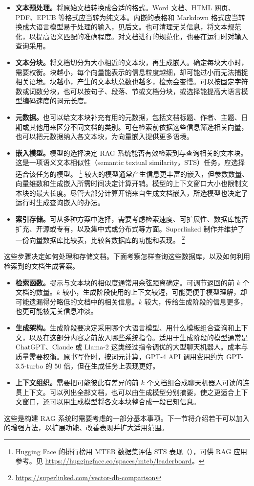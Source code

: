 \begin{itemize}
\item \textbf{文本预处理。}将原始文档转换成合适的格式。Word 文档、HTML 网页、PDF、EPUB 等格式应当转为纯文本。内嵌的表格和 Markdown 格式应当转换成大语言模型易于处理的输入，见后文。也可清理无关信息，将文本规范化，以提高语义匹配的准确程度。对文档进行的规范化，也要在运行时对输入查询采用。
\item \textbf{文本分块。}将文档切分为大小相近的文本块，再生成嵌入。确定每块大小时，需要权衡。块越小，每个向量能表示的信息粒度越细，却可能过小而无法捕捉相关语境。块越小，产生的文本块总数也越多，检索会变慢。可以按固定字符数或词数分块，也可以按句子、段落、节或文档分块，或选择能提高大语言模型编码速度的词元长度。
\item \textbf{元数据。}也可以给文本块补充有用的元数据，包括文档标题、作者、主题、日期或其他用来区分不同文档的类别。可在检索前依据这些信息筛选相关向量，也可以把元数据纳入各文本块，为向量嵌入提供更多语境。
\item \textbf{嵌入模型。}模型的选择决定 RAG 系统能否有效检索到与查询相关的文本块。这是一项语义文本相似性（semantic textual similarity，STS）任务，应选择适合该任务的模型。%
\footnote{Hugging Face 的排行榜用 MTEB 数据集评估 STS 表现（），可供 RAG 应用参考。见 \url{https://huggingface.co/spaces/mteb/leaderboard}。}
较大的模型通常产生信息更丰富的嵌入，但参数数量、向量维数和生成嵌入所需时间决定计算开销。模型的上下文窗口大小也限制文本块的最大长度。尽管大部分计算开销来自生成文档嵌入，所选模型也决定了运行时生成查询嵌入的办法。
\item \textbf{索引存储。}可从多种方案中选择，需要考虑检索速度、可扩展性、数据库能否扩充、开源或专有，以及集中式或分布式等方面。Superlinked 制作并维护了一份向量数据库比较表，比较各数据库的功能和表现。%
\footnote{\url{https://superlinked.com/vector-db-comparison}}
\end{itemize}

这些步骤决定如何处理和存储文档。下面考察怎样查询这些数据库，以及如何利用检索到的文档生成答案。

\begin{itemize}
\item \textbf{检索函数。}提示与文本块的相似度通常用余弦距离确定。可调节返回的前 $k$ 个文档的数量。$k$ 较小，生成阶段使用的上下文较短，可能更便于模型理解，却可能遗漏得分略低的文档中的相关信息。$k$ 较大，传给生成阶段的信息更多，也更可能被无关信息冲淡。
\item \textbf{生成架构。}生成阶段要决定采用哪个大语言模型、用什么模板组合查询和上下文，以及在这部分内容之前放入哪些系统指令。适用于生成阶段的模型通常是 ChatGPT、Claude 或 Llama-2 这类经过指令调优的大型聊天机器人。成本与质量需要权衡。原书写作时，按词元计算，GPT-4 API 调用费用约为 GPT-3.5-turbo 的 50 倍，但在生成任务上表现更好。
\item \textbf{上下文组织。}需要把可能彼此有差异的前 $k$ 个文档组合成聊天机器人可读的连贯上下文。可以列出全部文档，也可以由生成模型分别摘要，使之更适合上下文窗口，还可以用生成模型将各文本块整合成一段已知信息。
\end{itemize}

这些是构建 RAG 系统时需要考虑的一部分基本事项。下一节将介绍若干可以加入的增强方法，以扩展功能、改善表现并扩大适用范围。







